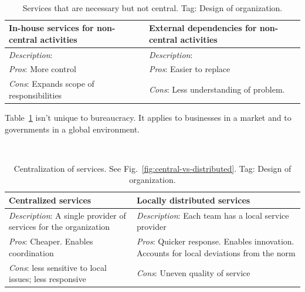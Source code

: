 \ \\

\begin{center}
\begin{table}[ht]
\begin{tabular}{ | m{\dilemmatablewidth}| m{\dilemmatablewidth} | } 
  \hline
  \textbf{In-house services for non-central activities } &
  \textbf{External dependencies for non-central activities} \\
  \hline
  \textit{Description}:  &
  \textit{Description}:  \\  
  \hline
  \textit{Pros}: More control &
  \textit{Pros}: Easier to replace \\
  \hline
  \textit{Cons}: Expands scope of responsibilities & 
  \textit{Cons}: Less understanding of problem.  \\
  \hline
\end{tabular}
\caption{Services that are necessary but not central.
{\tiny Tag: Design of organization.}
}
\label{table:inhouse-vs-external}
\end{table}
\end{center}

Table~\ref{table:inhouse-vs-external} isn't unique to bureaucracy. It applies to businesses in a market and to governments in a global environment. 

\ \\

\begin{center}
\begin{table}[ht]
\begin{tabular}{ | m{\dilemmatablewidth}| m{\dilemmatablewidth} | } 
  \hline
  \textbf{Centralized services} &
  \textbf{Locally distributed services} \\
  \hline
  \textit{Description}: A single provider of services for the organization &
  \textit{Description}: Each team has a local service provider \\  
  \hline
  \textit{Pros}: Cheaper. Enables coordination &
  \textit{Pros}: Quicker response. 
  Enables innovation. 
  Accounts for local deviations from the norm \\
  \hline
  \textit{Cons}: less sensitive to local issues; less responsive & 
  \textit{Cons}: Uneven quality of service \\
  \hline
\end{tabular}
\caption{Centralization of services. 
See Fig.~\ref{fig:central-vs-distributed}.
{\tiny Tag: Design of organization.}
}
\label{table:central-vs-distributed}
\end{table}
\end{center}

